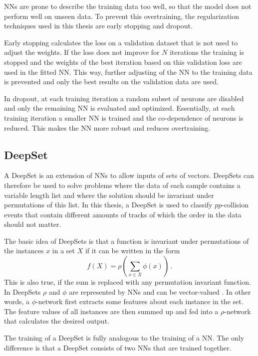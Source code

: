 NNs are prone to describe the training data too well, so that the model does not perform well on unseen data.
To prevent this overtraining, the regularization techniques used in this thesis are early stopping and dropout.

Early stopping calculates the loss on a validation dataset that is not used to adjust the weights.
If the loss does not improve for $N$ iterations the training is stopped and the weights of the best iteration based on this validation loss are used in the fitted NN.
This way, further adjusting of the NN to the training data is prevented and only the best results on the validation data are used.

In dropout, at each training iteration a random subset of neurons are disabled and only the remaining NN is evaluated and optimized.
Essentially, at each training iteration a smaller NN is trained and the co-dependence of neurons is reduced.
This makes the NN more robust and reduces overtraining.

\subsection{DeepSet}
\label{sec:DeepSet}

A DeepSet is an extension of NNs to allow inputs of sets of vectors.
DeepSets can therefore be used to solve problems where the data of each sample contains a variable length list and where the solution should be invariant under permutations of this list.
In this thesis, a DeepSet is used to classify $pp$-collision events that contain different amounts of tracks of which the order in the data should not matter.

The basic idea of DeepSets is that a function is invariant under permutations of the instances $x$ in a set $X$ if it can be written in the form 
\begin{equation*}
    f(X) = \rho \left( \sum_{x \in X} \phi (x) \right) \, .
\end{equation*}
This is also true, if the sum is replaced with any permutation invariant function.
In DeepSets $\rho$ and $\phi$ are represented by NNs and can be vector-valued \cite{deepset}.
In other words, a $\phi$-network first extracts some features about each instance in the set.
The feature values of all instances are then summed up and fed into a $\rho$-network that calculates the desired output.

The training of a DeepSet is fully analogous to the training of a NN.
The only difference is that a DeepSet consists of two NNs that are trained together.




